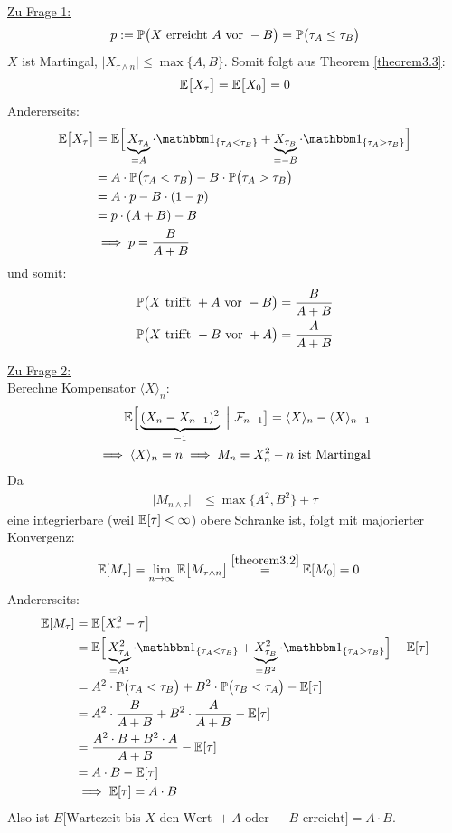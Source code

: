 \begin{beisp}
\underline{Zu Frage 1:}
\begin{align*}
p:=\P\big( X\text{ erreicht }A\text{ vor }-B\big)=\P\big(\tau_A\leq\tau_B\big)
\end{align*}
$X$ ist Martingal, $\big|X_{\tau\wedge n}\big|\leq\max\lbrace A,B\rbrace$. Somit folgt aus Theorem \ref{theorem3.3}:
\begin{align*}
\E\big[X_\tau\big]=\E\big[X_0\big]=0
\end{align*}
Andererseits: 
\begin{align*}
\E\big[X_\tau\big]&=\E\Big[\underbrace{X_{\tau_A}}_{=A}\cdot\indi_{\lbrace\tau_A<\tau_B\rbrace}+\underbrace{X_{\tau_B}}_{=-B}\cdot\indi_{\lbrace\tau_A>\tau_B\rbrace}\Big]\\
&=A\cdot\P\big(\tau_A<\tau_B\big)-B\cdot\P\big(\tau_A>\tau_B\big)\\
&=A\cdot p-B\cdot(1-p)\\
&=p\cdot(A+B)-B\\
&\implies
p=\frac{B}{A+B}
\end{align*}
und somit:
\begin{align*}
\P\big(X\text{ trifft }+A\text{ vor }-B\big)&=\frac{B}{A+B}\\
\P\big(X\text{ trifft }-B\text{ vor }+A\big)&=\frac{A}{A+B}\\
\end{align*}

\underline{Zu Frage 2:}\\
Berechne Kompensator $\langle X\rangle_n$:
\begin{align*}
\E\Big[\underbrace{(X_n-X_{n-1})^2}_{=1}~\Big|~\F_{n-1}\big]=\langle X\rangle_n-\langle X\rangle_{n-1}\\
\implies \langle X\rangle_n=n
\implies M_n=X_n^2-n\text{ ist Martingal}
\end{align*}
Da
\begin{align*}
\big|M_{n\wedge\tau}\big|&\leq
\max\lbrace A^2,B^2\rbrace+\tau
\end{align*}
eine integrierbare (weil $\E[\tau]<\infty$) obere Schranke ist, folgt mit majorierter Konvergenz:
\begin{align*}
\E[M_\tau]&=\limn\E\big[M_{\tau\wedge n}\big]\stackeq{\ref{theorem3.2}}
\E[M_0]=0
\end{align*}
Andererseits:
\begin{align*}
\E[M_\tau]
&=\E\big[X_\tau^2-\tau\big]\\
&=\E\Big[\underbrace{X^2_{\tau_A}}_{=A^2}\cdot\indi_{\lbrace\tau_A<\tau_B\rbrace}+\underbrace{X^2_{\tau_B}}_{=B^2}\cdot\indi_{\lbrace\tau_A>\tau_B\rbrace}\Big] - \E[\tau]\\
&=A^2\cdot\P\big(\tau_A<\tau_B\big)+B^2\cdot\P\big(\tau_B<\tau_A\big)-\E[\tau]\\
&=A^2\cdot\frac{B}{A+B}+B^2\cdot\frac{A}{A+B}-\E[\tau]\\
&=\frac{A^2\cdot B + B^2 \cdot A}{A+B}-\E[\tau]\\
&=A\cdot B-\E[\tau]\\
&\implies
\E[\tau]=A\cdot B
\end{align*}
Also ist $E\big[\text{Wartezeit bis }X\text{ den Wert }+A\text{ oder }-B\text{ erreicht}\big]=A\cdot B$.\\


\end{beisp}
